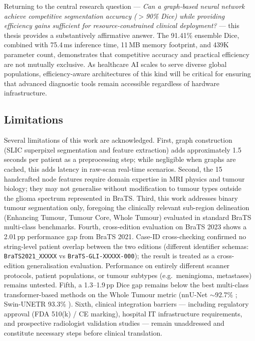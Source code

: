 \documentclass{article}
\begin{document}
Returning to the central research question — \textit{Can a graph-based neural network achieve competitive segmentation accuracy ($>$90\% Dice) while providing efficiency gains sufficient for resource-constrained clinical deployment?} — this thesis provides a substantively affirmative answer. The 91.41\% ensemble Dice, combined with 75.4\,ms inference time, 11\,MB memory footprint, and 439K parameter count, demonstrates that competitive accuracy and practical efficiency are not mutually exclusive. As healthcare AI scales to serve diverse global populations, efficiency-aware architectures of this kind will be critical for ensuring that advanced diagnostic tools remain accessible regardless of hardware infrastructure.


\subsection{Limitations}

Several limitations of this work are acknowledged. First, graph construction (SLIC superpixel segmentation and feature extraction) adds approximately 1.5 seconds per patient as a preprocessing step; while negligible when graphs are cached, this adds latency in raw-scan real-time scenarios. Second, the 15 handcrafted node features require domain expertise in MRI physics and tumour biology; they may not generalise without modification to tumour types outside the glioma spectrum represented in BraTS. Third, this work addresses binary tumour segmentation only, foregoing the clinically relevant sub-region delineation (Enhancing Tumour, Tumour Core, Whole Tumour) evaluated in standard BraTS multi-class benchmarks. Fourth, cross-edition evaluation on BraTS 2023 shows a 2.01\,pp performance gap from BraTS 2021. Case-ID cross-checking confirmed no string-level patient overlap between the two editions (different identifier schemas: \texttt{BraTS2021\_XXXXX} vs \texttt{BraTS-GLI-XXXXX-000}); the result is treated as a cross-edition generalisation evaluation. Performance on entirely different scanner protocols, patient populations, or tumour subtypes (e.g.\ meningioma, metastases) remains untested. Fifth, a 1.3--1.9\,pp Dice gap remains below the best multi-class transformer-based methods on the Whole Tumour metric (nnU-Net $\sim$92.7\% \cite{isensee2021nnunet}; Swin-UNETR 93.3\% \cite{hatamizadeh2022swin}). Sixth, clinical integration barriers — including regulatory approval (FDA 510(k) / CE marking), hospital IT infrastructure requirements, and prospective radiologist validation studies — remain unaddressed and constitute necessary steps before clinical translation.
\end{document}
